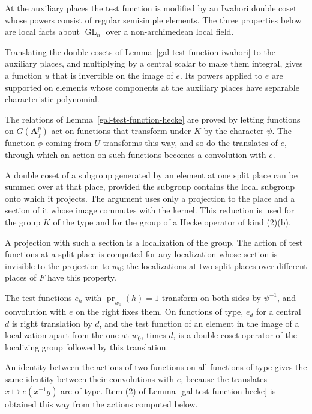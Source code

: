 At the auxiliary places the test function is modified by an Iwahori double coset whose powers consist of
regular semisimple elements. The three properties below are local facts about
$\operatorname{GL}_n$ over a non-archimedean local field.

Translating the double cosets of Lemma~\ref{gal-test-function-iwahori} to the auxiliary places, and
multiplying by a central scalar to make them integral, gives a function $u$ that is invertible on the image
of $e$. Its powers applied to $e$ are supported on elements whose components at the auxiliary places have
separable characteristic polynomial.

The relations of Lemma~\ref{gal-test-function-hecke} are proved by letting functions on $G(\mathbf A_f^p)$
act on functions that transform under $K$ by the character $\psi$. The function $\phi$ coming from $U$
transforms this way, and so do the translates of $e$, through which an action on such functions becomes a
convolution with $e$.

A double coset of a subgroup generated by an element at one split place can be summed over at that place,
provided the subgroup contains the local subgroup onto which it projects. The argument uses only a
projection to the place and a section of it whose image commutes with the kernel. This reduction is used
for the group $K$ of the type and for the group of a Hecke operator of kind (2)(b).

A projection with such a section is a localization of the group. The action of test functions at a split
place is computed for any localization whose section is invisible to the projection to $w_0$; the
localizations at two split places over different places of $F$ have this property.

The test functions $e_h$ with $\operatorname{pr}_{w_0}(h)=1$ transform on both sides by $\psi^{-1}$, and
convolution with $e$ on the right fixes them. On functions of type, $e_d$ for a central $d$ is right
translation by $d$, and the test function of an element in the image of a localization apart from the one
at $w_0$, times $d$, is a double coset operator of the localizing group followed by this translation.

An identity between the actions of two functions on all functions of type gives the same identity between
their convolutions with $e$, because the translates $x\mapsto e(x^{-1}g)$ are of type. Item (2) of
Lemma~\ref{gal-test-function-hecke} is obtained this way from the actions computed below.

